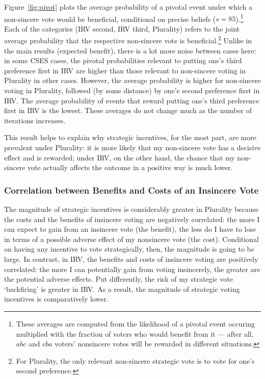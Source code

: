 \documentclass[11pt, letter]{article}
\begin{document}
Figure~\ref{fig:pivot} plots the average probability of a pivotal event under which a non-sincere vote would be beneficial, conditional on precise beliefs ($s = 85$).\footnote{These averages are computed from the likelihood of a pivotal event occuring multiplied with the fraction of voters who would benefit from it --- after all, $abc$ and $cba$ voters' nonsincere votes will be rewarded in different situations.} Each of the categories (IRV second, IRV third, Plurality) refers to the joint average probability that the respective non-sincere vote is beneficial.\footnote{For Plurality, the only relevant non-sincere strategic vote is to vote for one's second preference.} Unlike in the main results (expected benefit), there is a lot more noise between cases here: in some CSES cases, the pivotal probabilities relevant to putting one's third preference first in IRV are higher than those relevant to non-sincere voting in Plurality in other cases. However, the average probability is higher for non-sincere voting in Plurality, followed (by some distance) by one's second preference first in IRV. The average probability of events that reward putting one's third preference first in IRV is the lowest. These averages do not change much as the number of iterations increases.

This result helps to explain why strategic incentives, for the most part, are more prevalent under Plurality: it is more likely that my non-sincere vote has a decisive effect and is rewarded; under IRV, on the other hand, the chance that my non-sincere vote actually affects the outcome in a positive way is much lower.


\subsubsection{Correlation between Benefits and Costs of an Insincere Vote}

The magnitude of strategic incentives is considerably greater in Plurality because the costs and the benefits of insincere voting are negatively correlated: the more I can expect to gain from an insincere vote (the benefit), the less do I have to lose in terms of a possible adverse effect of my nonsincere vote (the cost). Conditional on having any incentive to vote strategically, then, the magnitude is going to be large. In contrast, in IRV, the benefits and costs of insincere voting are positively correlated: the more I can potentially gain from voting insincerely, the greater are the potential adverse effects. Put differently, the risk of my strategic vote `backfiring' is greater in IRV. As a result, the magnitude of strategic voting incentives is comparatively lower.
\end{document}
